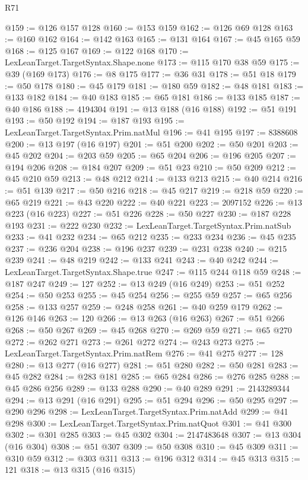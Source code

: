 \begin{lexlean}{R71}
\begin{coremodule}
@159 := @126 @157 @128
@160 := @153 @159
@162 := @126 @69 @128
@163 := @160 @162
@164 := @142 @163
@165 := @131 @164
@167 := @45 @165 @59
@168 := @125 @167
@169 := @122 @168
@170 := LexLeanTarget.TargetSyntax.Shape.none
@173 := @115 @170 @38 @59
@175 := @39 (@169 @173)
@176 := @8 @175
@177 := @36 @31
@178 := @51 @18
@179 := @50 @178
@180 := @45 @179
@181 := @180 @59
@182 := @48 @181
@183 := @133 @182
@184 := @40 @183
@185 := @65 @181
@186 := @133 @185
@187 := @40 @186
@188 := 4194304
@191 := @13 @188 (@16 @188)
@192 := @51 @191
@193 := @50 @192
@194 := @187 @193
@195 := LexLeanTarget.TargetSyntax.Prim.natMul
@196 := @41 @195
@197 := 8388608
@200 := @13 @197 (@16 @197)
@201 := @51 @200
@202 := @50 @201
@203 := @45 @202
@204 := @203 @59
@205 := @65 @204
@206 := @196 @205
@207 := @194 @206
@208 := @184 @207
@209 := @51 @23
@210 := @50 @209
@212 := @45 @210 @59
@213 := @48 @212
@214 := @133 @213
@215 := @40 @214
@216 := @51 @139
@217 := @50 @216
@218 := @45 @217
@219 := @218 @59
@220 := @65 @219
@221 := @43 @220
@222 := @40 @221
@223 := 2097152
@226 := @13 @223 (@16 @223)
@227 := @51 @226
@228 := @50 @227
@230 := @187 @228 @193
@231 := @222 @230
@232 := LexLeanTarget.TargetSyntax.Prim.natSub
@233 := @41 @232
@234 := @65 @212
@235 := @233 @234
@236 := @45 @235
@237 := @236 @204
@238 := @196 @237
@239 := @231 @238
@240 := @215 @239
@241 := @48 @219
@242 := @133 @241
@243 := @40 @242
@244 := LexLeanTarget.TargetSyntax.Shape.true
@247 := @115 @244 @118 @59
@248 := @187 @247
@249 := 127
@252 := @13 @249 (@16 @249)
@253 := @51 @252
@254 := @50 @253
@255 := @45 @254
@256 := @255 @59
@257 := @65 @256
@258 := @133 @257
@259 := @248 @258
@261 := @40 @259 @179
@262 := @126 @146
@263 := 120
@266 := @13 @263 (@16 @263)
@267 := @51 @266
@268 := @50 @267
@269 := @45 @268
@270 := @269 @59
@271 := @65 @270
@272 := @262 @271
@273 := @261 @272
@274 := @243 @273
@275 := LexLeanTarget.TargetSyntax.Prim.natRem
@276 := @41 @275
@277 := 128
@280 := @13 @277 (@16 @277)
@281 := @51 @280
@282 := @50 @281
@283 := @45 @282
@284 := @283 @181
@285 := @65 @284
@286 := @276 @285
@288 := @45 @286 @256
@289 := @133 @288
@290 := @40 @289
@291 := 2143289344
@294 := @13 @291 (@16 @291)
@295 := @51 @294
@296 := @50 @295
@297 := @290 @296
@298 := LexLeanTarget.TargetSyntax.Prim.natAdd
@299 := @41 @298
@300 := LexLeanTarget.TargetSyntax.Prim.natQuot
@301 := @41 @300
@302 := @301 @285
@303 := @45 @302
@304 := 2147483648
@307 := @13 @304 (@16 @304)
@308 := @51 @307
@309 := @50 @308
@310 := @45 @309
@311 := @310 @59
@312 := @303 @311
@313 := @196 @312
@314 := @45 @313
@315 := 121
@318 := @13 @315 (@16 @315)

\end{coremodule}
\end{lexlean}
